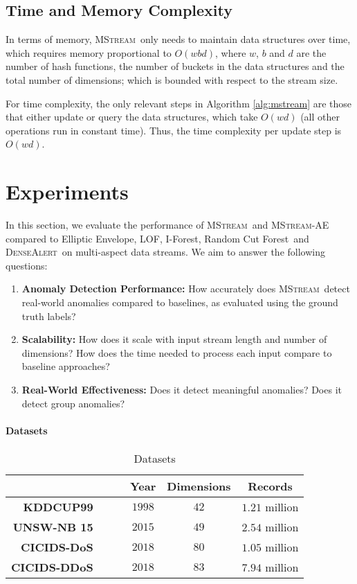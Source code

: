 \documentclass[sigconf]{acmart}
\newcommand{\method}{\textsc{MStream}}
\newcommand{\densealert}{\textsc{DenseAlert}}
\newcommand{\rcf}{Random Cut Forest}
\newcommand{\elliptic}{Elliptic Envelope}
\begin{document}
\subsection{Time and Memory Complexity}
\label{sec:timecomplexity}
In terms of memory, \method\ only needs to maintain data structures over time, which requires memory proportional to $O(wbd)$, where $w$, $b$ and $d$ are the number of hash functions, the number of buckets in the data structures and the total number of dimensions; which is bounded with respect to the stream size.

For time complexity, the only relevant steps in Algorithm \ref{alg:mstream} are those that either update or query the data structures, which take $O(wd)$ (all other operations run in constant time). Thus, the time complexity per update step is $O(wd)$. 
 \section{Experiments}
\label{sec:experiment}
In this section, we evaluate the performance of \method\ and \method-AE compared to \elliptic, LOF, I-Forest, \rcf\ and \densealert\  on multi-aspect data streams. We aim to answer the following questions:

\begin{enumerate}[label=\textbf{Q\arabic*.}]
\item {\bf Anomaly Detection Performance:} How accurately does \method\ detect real-world anomalies compared to baselines, as evaluated using the ground truth labels?
\item {\bf Scalability:} How does it scale with input stream length and number of dimensions? How does the time needed to process each input compare to baseline approaches?
\item {\bf Real-World Effectiveness:} Does it detect meaningful anomalies? Does it detect group anomalies?

\end{enumerate}

\paragraph{\textbf{Datasets}}

\iffalse
\begin{table}[!htb]
\centering
\caption{Datasets}
\label{tab:datasets}
\begin{tabular}{@{}rccc@{}}
\toprule
 & Year
 & Dimensions
 & Records
 \\ \midrule
 \textbf{KDDCUP99} \ \ \ \ & $1998$ & $42$ & $1.21$ million \\
 \textbf{UNSW-NB 15} \ \ \ \ & $2015$ & $49$ & $2.54$ million \\
 \textbf{CICIDS-DoS} \ \ \ \ & $2018$ & $80$ & $1.05$ million \\
\textbf{CICIDS-DDoS} \ \ \ \ & $2018$ & $83$ & $7.94$ million \\
\bottomrule
\end{tabular}
\end{table}
\end{document}
